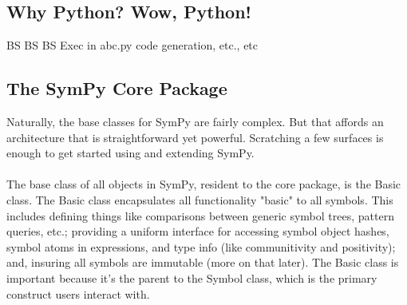\documentclass[11pt]{article}
\begin{document}
 \subsection{Why Python? Wow, Python!}
 BS BS BS
 Exec in abc.py code generation, etc., etc
 \subsection{The SymPy Core Package}
Naturally, the base classes for SymPy are fairly complex. But that affords an architecture that is straightforward yet powerful. Scratching a few surfaces is enough to get started using and extending SymPy.\\\\
The base class of all objects in SymPy, resident to the core package, is the Basic class. The Basic class encapsulates all functionality "basic" to all symbols. This includes defining things like comparisons between generic symbol trees, pattern queries, etc.; providing a uniform interface for accessing symbol object hashes, symbol atoms in expressions, and type info (like communitivity and positivity); and, insuring all symbols are immutable (more on that later). The Basic class is important because it's the parent to the Symbol class, which is the primary construct users interact with.
\end{document}
